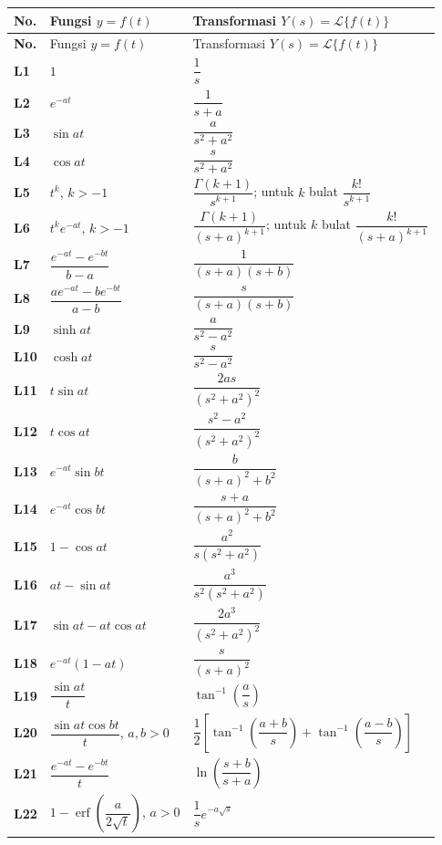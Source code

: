 \documentclass[10pt,a4paper]{article}
\newcommand{\Lcal}{\mathcal{L}}
\newcommand{\Lap}[1]{\Lcal\{#1\}}
\begin{document}
\small
\begin{longtable}{>{\bfseries}p{} p{} p{}}
\toprule
No. & Fungsi $y=f(t)$ & Transformasi $Y(s)=\Lap{f(t)}$\\
\midrule
\endfirsthead
\toprule
No. & Fungsi $y=f(t)$ & Transformasi $Y(s)=\Lap{f(t)}$\\
\midrule
\endhead
L1 & $1$ & $\dfrac{1}{s}$\\
L2 & $e^{-at}$ & $\dfrac{1}{s+a}$\\
L3 & $\sin at$ & $\dfrac{a}{s^2+a^2}$\\
L4 & $\cos at$ & $\dfrac{s}{s^2+a^2}$\\
L5 & $t^k$, $k>-1$ & $\dfrac{\Gamma(k+1)}{s^{k+1}}$; untuk $k$ bulat $\dfrac{k!}{s^{k+1}}$\\
L6 & $t^k e^{-at}$, $k>-1$ & $\dfrac{\Gamma(k+1)}{(s+a)^{k+1}}$; untuk $k$ bulat $\dfrac{k!}{(s+a)^{k+1}}$\\
L7 & $\dfrac{e^{-at}-e^{-bt}}{b-a}$ & $\dfrac{1}{(s+a)(s+b)}$\\
L8 & $\dfrac{ae^{-at}-be^{-bt}}{a-b}$ & $\dfrac{s}{(s+a)(s+b)}$\\
L9 & $\sinh at$ & $\dfrac{a}{s^2-a^2}$\\
L10 & $\cosh at$ & $\dfrac{s}{s^2-a^2}$\\
L11 & $t\sin at$ & $\dfrac{2as}{(s^2+a^2)^2}$\\
L12 & $t\cos at$ & $\dfrac{s^2-a^2}{(s^2+a^2)^2}$\\
L13 & $e^{-at}\sin bt$ & $\dfrac{b}{(s+a)^2+b^2}$\\
L14 & $e^{-at}\cos bt$ & $\dfrac{s+a}{(s+a)^2+b^2}$\\
L15 & $1-\cos at$ & $\dfrac{a^2}{s(s^2+a^2)}$\\
L16 & $at-\sin at$ & $\dfrac{a^3}{s^2(s^2+a^2)}$\\
L17 & $\sin at-at\cos at$ & $\dfrac{2a^3}{(s^2+a^2)^2}$\\
L18 & $e^{-at}(1-at)$ & $\dfrac{s}{(s+a)^2}$\\
L19 & $\dfrac{\sin at}{t}$ & $\tan^{-1}\left(\dfrac{a}{s}\right)$\\
L20 & $\dfrac{\sin at\cos bt}{t}$, $a,b>0$ & $\dfrac12\left[\tan^{-1}\left(\dfrac{a+b}{s}\right)+\tan^{-1}\left(\dfrac{a-b}{s}\right)\right]$\\
L21 & $\dfrac{e^{-at}-e^{-bt}}{t}$ & $\ln\left(\dfrac{s+b}{s+a}\right)$\\
L22 & $1-\operatorname{erf}\left(\dfrac{a}{2\sqrt{t}}\right)$, $a>0$ & $\dfrac{1}{s}e^{-a\sqrt{s}}$\\

\end{longtable}
\end{document}

